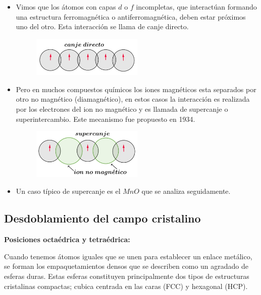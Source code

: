 \begin{itemize}
	\item Vimos que los átomos con capas $d$ o $f$ incompletas, que interactúan formando una estructura ferromagnética o antiferromagnética, deben estar próximos uno del otro. Esta interacción se llama de canje directo.
	
\begin{figure}[H]
    \centering
    \includegraphics[width=0.5\textwidth]{./Figures/canjeDirecto}
	\label{fig:canjeDirecto}
\end{figure}		
	
	
	\item Pero en muchos compuestos químicos los iones magnéticos esta separados por otro no magnético (diamagnético), en estos casos la interacción es realizada por los electrones del ion no magnético y es llamada de supercanje o superintercambio. Este mecanismo fue propuesto en 1934.
	

\begin{figure}[H]
    \centering
    \includegraphics[width=0.5\textwidth]{./Figures/canjeSupercanje}
	\label{fig:canjeSupercanje}
\end{figure}	
	
	
	\item Un caso típico de supercanje es el $MnO$ que se analiza seguidamente.
\end{itemize}

\subsection{Desdoblamiento del campo cristalino}

\textbf{Posiciones octaédrica y tetraédrica:}

Cuando tenemos átomos iguales que se unen para establecer un enlace metálico, se forman los empaquetamientos densos que se describen como un agradado de esferas duras. Estas esferas constituyen principalmente dos tipos de estructuras cristalinas compactas; cubica centrada en las caras (FCC) y hexagonal (HCP).

